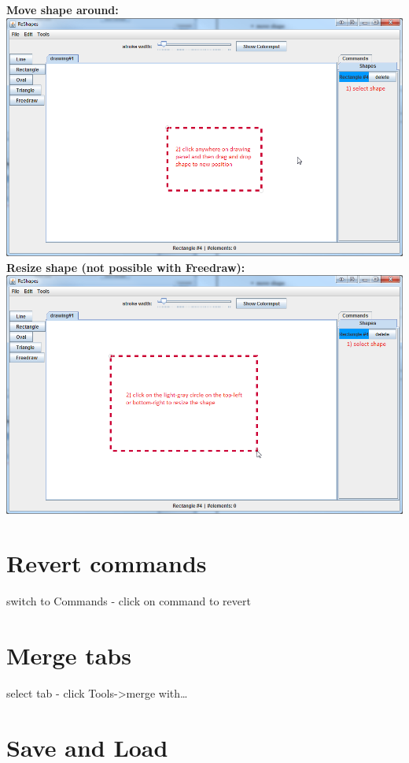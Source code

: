 \documentclass[12pt, accentcolor=tud9c, linedtoc, bigchapter, colorback, noresetcounter, numbersubsubsec]{tudreport}
\begin{document}
\textbf{Move shape around:} \\
\includegraphics[width=1\textwidth]{img/move_shape} \\

\textbf{Resize shape (not possible with Freedraw):} \\
\includegraphics[width=1\textwidth]{img/resize_shape}

\section{Revert commands}

switch to Commands - click on command to revert


\section{Merge tabs}

select tab - click Tools->merge with\dots

\section{Save and Load}
\end{document}
